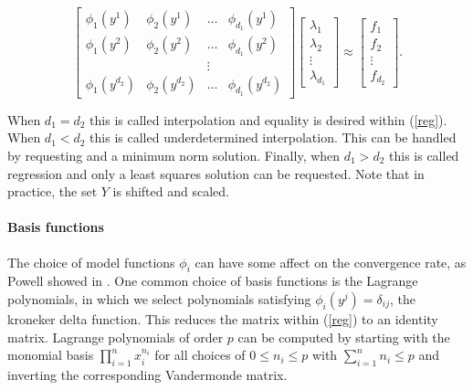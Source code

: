 \documentclass{article}
\let\oldref\ref
\renewcommand{\ref}[1]{(\oldref{#1})}
\begin{document}
\begin{equation}
\label{reg}
\begin{bmatrix}
    \phi_1(y^1)      & \phi_2(y^1)       & \ldots & \phi_{d_1}(y^1)      \\
    \phi_1(y^2)      & \phi_2(y^2)       & \dots  & \phi_{d_1}(y^2)      \\
                     &                   & \vdots &                      \\
    \phi_1(y^{d_2})  & \phi_2(y^{d_2})   & \ldots & \phi_{d_1}(y^{d_2})
\end{bmatrix}
\begin{bmatrix}
    \lambda_1      \\
    \lambda_2      \\
    \vdots         \\            
    \lambda_{d_1}
\end{bmatrix}
\approx
\begin{bmatrix}
    f_1      \\
    f_2      \\
    \vdots         \\            
    f_{d_2}
\end{bmatrix}.
\end{equation}

When $d_1 = d_2$ this is called interpolation and equality is desired within \ref{reg}.
When $d_1 < d_2$ this is called underdetermined interpolation.
This can be handled by requesting and a minimum norm solution.
Finally, when $d_1 > d_2$ this is called regression and only a least squares solution can be requested.
Note that in practice, the set $Y$ is shifted and scaled.

\paragraph{Basis functions}

The choice of model functions $\phi_i$ can have some affect on the convergence rate, as Powell showed in \cite{DUMMY:PowellRadialBasis}.
One common choice of basis functions is the Lagrange polynomials, in which we select polynomials satisfying $\phi_{i}(y^j) = \delta_{ij}$, the kroneker delta function.
This reduces the matrix within \ref{reg} to an identity matrix.
Lagrange polynomials of order $p$ can be computed by starting with the monomial basis $\prod_{i=1}^{n} x_i^{n_i}$ for all choices of $0 \le n_i \le p$ with $\sum_{i=1}^n n_i \le p$ and inverting the corresponding Vandermonde matrix.
\end{document}
